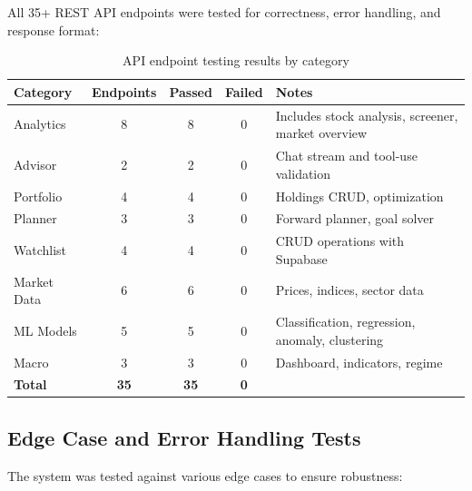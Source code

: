 \documentclass[12pt, a4paper, oneside]{report}
\begin{document}
All 35+ REST API endpoints were tested for correctness, error handling, and response format:

\begin{table}[H]
\centering
\caption{API endpoint testing results by category}
\label{tab:api_testing}
\begin{tabularx}{\textwidth}{@{}l c c c X@{}}
\toprule
\textbf{Category} & \textbf{Endpoints} & \textbf{Passed} & \textbf{Failed} & \textbf{Notes} \\
\midrule
Analytics & 8 & 8 & 0 & Includes stock analysis, screener, market overview \\
Advisor & 2 & 2 & 0 & Chat stream and tool-use validation \\
Portfolio & 4 & 4 & 0 & Holdings CRUD, optimization \\
Planner & 3 & 3 & 0 & Forward planner, goal solver \\
Watchlist & 4 & 4 & 0 & CRUD operations with Supabase \\
Market Data & 6 & 6 & 0 & Prices, indices, sector data \\
ML Models & 5 & 5 & 0 & Classification, regression, anomaly, clustering \\
Macro & 3 & 3 & 0 & Dashboard, indicators, regime \\
\midrule
\textbf{Total} & \textbf{35} & \textbf{35} & \textbf{0} & \\
\bottomrule
\end{tabularx}
\end{table}

\subsection{Edge Case and Error Handling Tests}

The system was tested against various edge cases to ensure robustness:
\end{document}
